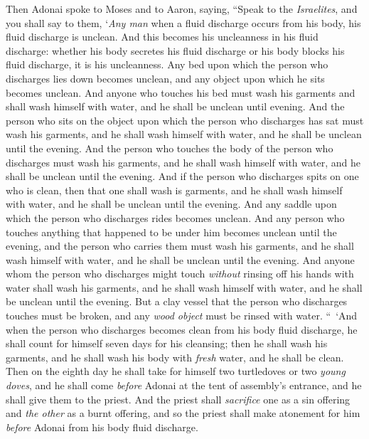 \begin{biblechapter} %
 Then Adonai spoke to Moses and to Aaron, saying,
\verse “Speak to the \textit{Israelites}, and you shall say to them, ‘\textit{Any man} when a fluid discharge occurs from his body, his fluid discharge is unclean.
\verse And this becomes his uncleanness in his fluid discharge: whether his body secretes his fluid discharge or his body blocks his fluid discharge, it is his uncleanness.
\verse Any bed upon which the person who discharges lies down becomes unclean, and any object upon which he sits becomes unclean.
\verse And anyone who touches his bed must wash his garments and shall wash himself with water, and he shall be unclean until evening.
\verse And the person who sits on the object upon which the person who discharges has sat must wash his garments, and he shall wash himself with water, and he shall be unclean until the evening.
\verse And the person who touches the body of the person who discharges must wash his garments, and he shall wash himself with water, and he shall be unclean until the evening.
\verse And if the person who discharges spits on one who is clean, then that one shall wash is garments, and he shall wash himself with water, and he shall be unclean until the evening.
\verse And any saddle upon which the person who discharges rides becomes unclean.
\verse And any person who touches anything that happened to be under him becomes unclean until the evening, and the person who carries them must wash his garments, and he shall wash himself with water, and he shall be unclean until the evening.
\verse And anyone whom the person who discharges might touch \textit{without} rinsing off his hands with water shall wash his garments, and he shall wash himself with water, and he shall be unclean until the evening.
\verse But a clay vessel that the person who discharges touches must be broken, and any \textit{wood object} must be rinsed with water.
\verse “ ‘And when the person who discharges becomes clean from his body fluid discharge, he shall count for himself seven days for his cleansing; then he shall wash his garments, and he shall wash his body with \textit{fresh} water, and he shall be clean.
\verse Then on the eighth day he shall take for himself two turtledoves or two \textit{young doves}, and he shall come \textit{before} Adonai at the tent of assembly’s entrance, and he shall give them to the priest.
\verse And the priest shall \textit{sacrifice} one as a sin offering and \textit{the other} as a burnt offering, and so the priest shall make atonement for him \textit{before} Adonai from his body fluid discharge.

\end{biblechapter}
